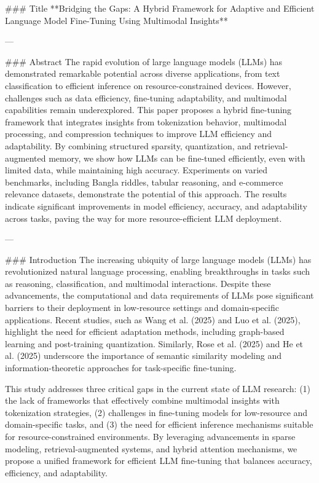 ### Title  
**Bridging the Gaps: A Hybrid Framework for Adaptive and Efficient Language Model Fine-Tuning Using Multimodal Insights**

---

### Abstract  
The rapid evolution of large language models (LLMs) has demonstrated remarkable potential across diverse applications, from text classification to efficient inference on resource-constrained devices. However, challenges such as data efficiency, fine-tuning adaptability, and multimodal capabilities remain underexplored. This paper proposes a hybrid fine-tuning framework that integrates insights from tokenization behavior, multimodal processing, and compression techniques to improve LLM efficiency and adaptability. By combining structured sparsity, quantization, and retrieval-augmented memory, we show how LLMs can be fine-tuned efficiently, even with limited data, while maintaining high accuracy. Experiments on varied benchmarks, including Bangla riddles, tabular reasoning, and e-commerce relevance datasets, demonstrate the potential of this approach. The results indicate significant improvements in model efficiency, accuracy, and adaptability across tasks, paving the way for more resource-efficient LLM deployment.

---

### Introduction  
The increasing ubiquity of large language models (LLMs) has revolutionized natural language processing, enabling breakthroughs in tasks such as reasoning, classification, and multimodal interactions. Despite these advancements, the computational and data requirements of LLMs pose significant barriers to their deployment in low-resource settings and domain-specific applications. Recent studies, such as Wang et al. (2025) and Luo et al. (2025), highlight the need for efficient adaptation methods, including graph-based learning and post-training quantization. Similarly, Rose et al. (2025) and He et al. (2025) underscore the importance of semantic similarity modeling and information-theoretic approaches for task-specific fine-tuning.

This study addresses three critical gaps in the current state of LLM research: (1) the lack of frameworks that effectively combine multimodal insights with tokenization strategies, (2) challenges in fine-tuning models for low-resource and domain-specific tasks, and (3) the need for efficient inference mechanisms suitable for resource-constrained environments. By leveraging advancements in sparse modeling, retrieval-augmented systems, and hybrid attention mechanisms, we propose a unified framework for efficient LLM fine-tuning that balances accuracy, efficiency, and adaptability.

